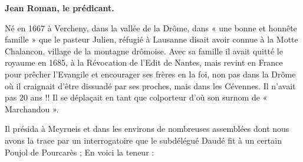 


{\large\bfseries Jean Roman, le prédicant.}

\vspace{0.35em}

Né en 1667 à Vercheny, dans la vallée de la Drôme, dans « une bonne et honnête famille » que le pasteur Julien, réfugié à Lausanne disait avoir connue à la Motte Chalancon, village de la montagne drômoise. Avec sa famille il avait quitté le royaume en 1685, à la Révocation de l’Edit de Nantes, mais revint en France pour prêcher l’Evangile et encourager ses frères en la foi, non pas dans la Drôme où il craignait d’être dissuadé par ses proches, mais dans les Cévennes. Il n’avait pas 20 ans !! Il se déplaçait en tant que colporteur d’où son surnom de « Marchandou ».

Il présida à Meyrueis et dans les environs de nombreuses assemblées dont nous avons la trace par un interrogatoire que le subdélégué Daudé fit à un certain Poujol de Pourcarès ; En voici la teneur :

\vspace{0.35em}

